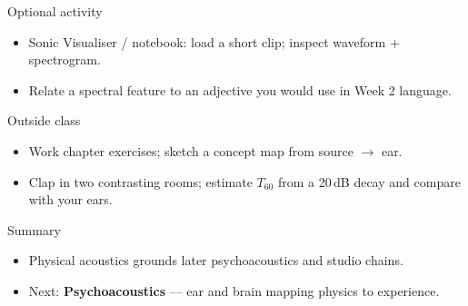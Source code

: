 \documentclass[aspectratio=169]{beamer}
\begin{document}
\begin{frame}{Optional activity}
  \begin{itemize}
    \item Sonic Visualiser / notebook: load a short clip; inspect waveform + spectrogram.
    \item Relate a spectral feature to an adjective you would use in Week 2 language.
  \end{itemize}
\end{frame}

\begin{frame}{Outside class}
  \begin{itemize}
    \item Work chapter exercises; sketch a concept map from source $\rightarrow$ ear.
    \item Clap in two contrasting rooms; estimate $T_{60}$ from a 20\,dB decay and compare with your ears.
  \end{itemize}
\end{frame}

\begin{frame}{Summary}
  \begin{itemize}
    \item Physical acoustics grounds later psychoacoustics and studio chains.
    \item Next: \textbf{Psychoacoustics} — ear and brain mapping physics to experience.
  \end{itemize}
\end{frame}
\end{document}

